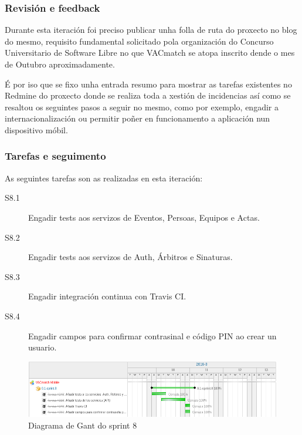       \subsubsection{Revisión e feedback}
      Durante esta iteración foi preciso publicar unha folla de ruta do 
proxecto no blog do mesmo, requisito fundamental solicitado pola organización 
do Concurso Universitario de Software Libre no que VACmatch se atopa inscrito 
dende o mes de Outubro aproximadamente.

      É por iso que se fixo unha entrada resumo para mostrar as tarefas 
existentes no Redmine do proxecto donde se realiza toda a xestión de 
incidencias así como se resaltou os seguintes pasos a seguir no mesmo, como por 
exemplo, engadir a internacionalización ou permitir poñer en funcionamento a 
aplicación nun dispositivo móbil.

      \subsubsection{Tarefas e seguimento}

      As seguintes tarefas son as realizadas en esta iteración:

        \begin{description}
         \item [S8.1] Engadir tests aos servizos de Eventos, Persoas, Equipos e 
Actas.
         \item [S8.2] Engadir tests aos servizos de Auth, Árbitros e Sinaturas.
         \item [S8.3] Engadir integración continua con Travis CI.
         \item [S8.4] Engadir campos para confirmar contrasinal e código PIN ao 
crear un usuario.
        \end{description}

        \begin{figure}[h!]
          \begin{center}
          \includegraphics[width=\textwidth]{./img/gant_diagrams/08.png}
          \caption{Diagrama de Gant do sprint 8}
          \label{fig:gant08}
          \end{center}
        \end{figure}

